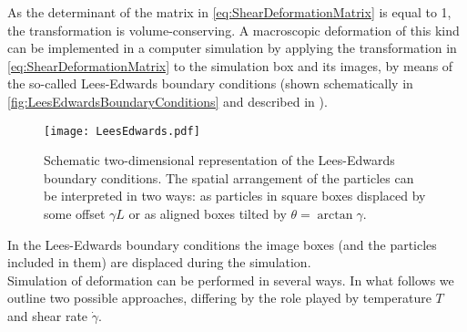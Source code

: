 As the determinant of the matrix in \autoref{eq:ShearDeformationMatrix} is equal to 1, the transformation is volume-conserving. 
A macroscopic deformation of this kind can be implemented in a computer simulation by applying the transformation in \autoref{eq:ShearDeformationMatrix} to the simulation box and its images, by means of the so-called Lees-Edwards boundary conditions (shown schematically in \autoref{fig:LeesEdwardsBoundaryConditions} and described in \cite{allen1989computer}).

\begin{figure}[!h] 
\centering 
\texttt{[image: LeesEdwards.pdf]} 
\caption{Schematic two-dimensional representation of the Lees-Edwards boundary conditions. The spatial arrangement of the particles can be interpreted in two ways: as particles \label{fig:LeesEdwardsBoundaryConditions} in square boxes displaced by some offset $\gamma L$ or as aligned boxes tilted by $\theta = \arctan \gamma$.}
\end{figure}

In the Lees-Edwards boundary conditions the image boxes (and the particles included in them) are displaced during the simulation.\\
Simulation of deformation can be performed in several ways. In what follows we outline two possible approaches, differing by the role played by temperature $T$ and shear rate $\dot{\gamma}$.

